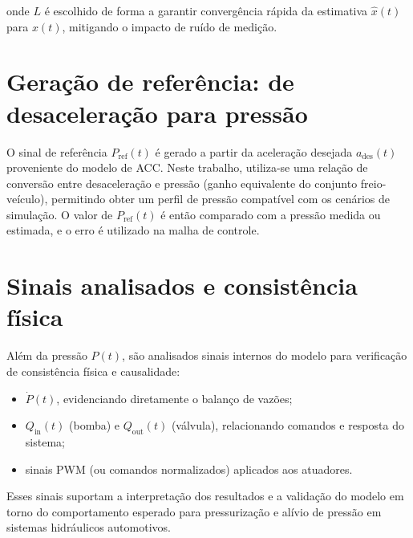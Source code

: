 onde $L$ é escolhido de forma a garantir convergência rápida da estimativa $\hat{x}(t)$ para $x(t)$, mitigando o impacto de ruído de medição.

\section{Geração de referência: de desaceleração para pressão}
\label{sec:controle-ref}

O sinal de referência $P_{\text{ref}}(t)$ é gerado a partir da aceleração desejada $a_{\text{des}}(t)$ proveniente do modelo de ACC. Neste trabalho, utiliza-se uma relação de conversão entre desaceleração e pressão (ganho equivalente do conjunto freio-veículo), permitindo obter um perfil de pressão compatível com os cenários de simulação. O valor de $P_{\text{ref}}(t)$ é então comparado com a pressão medida ou estimada, e o erro é utilizado na malha de controle.

\section{Sinais analisados e consistência física}
\label{sec:controle-sinais}

Além da pressão $P(t)$, são analisados sinais internos do modelo para verificação de consistência física e causalidade:
\begin{itemize}
\item $\dot{P}(t)$, evidenciando diretamente o balanço de vazões;
\item $Q_{\text{in}}(t)$ (bomba) e $Q_{\text{out}}(t)$ (válvula), relacionando comandos e resposta do sistema;
\item sinais \gls{PWM} (ou comandos normalizados) aplicados aos atuadores.
\end{itemize}

Esses sinais suportam a interpretação dos resultados e a validação do modelo em torno do comportamento esperado para pressurização e alívio de pressão em sistemas hidráulicos automotivos.